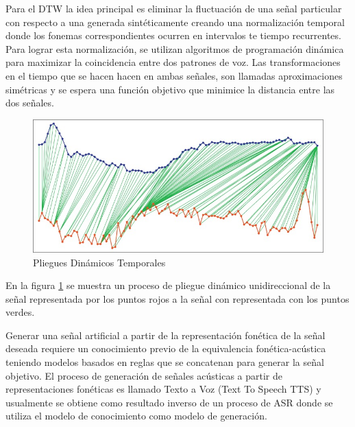 Para el DTW la idea principal es eliminar la fluctuación de una señal particular con respecto a una generada sintéticamente creando una normalización temporal donde los fonemas correspondientes ocurren en intervalos te tiempo recurrentes. Para lograr esta normalización, se utilizan algoritmos de programación dinámica para maximizar la coincidencia entre dos patrones de voz. Las transformaciones en el tiempo que se hacen hacen  en ambas señales, son llamadas aproximaciones simétricas y se espera una función objetivo que minimice la distancia entre las dos señales.

\begin{figure}[H]

\centering
\caption{Pliegues Dinámicos Temporales \cite{Zhang2017DynamicLength}}
\label{img:dtw}
\includegraphics[scale=0.50]{imagenes/dtw.jpg}
\end{figure}

En la figura \ref{img:dtw} se muestra un proceso de pliegue dinámico unidireccional de la señal representada por los puntos rojos a la señal con representada con los puntos verdes.

Generar una señal artificial a partir de la representación fonética de la señal deseada requiere un conocimiento previo de la equivalencia fonética-acústica teniendo modelos basados en reglas que se concatenan para generar la señal objetivo. El proceso de generación de señales acústicas a partir de representaciones fonéticas es llamado Texto a Voz (Text To Speech TTS) y usualmente se obtiene como resultado inverso de un proceso de ASR donde se utiliza el modelo de conocimiento como modelo de generación.

